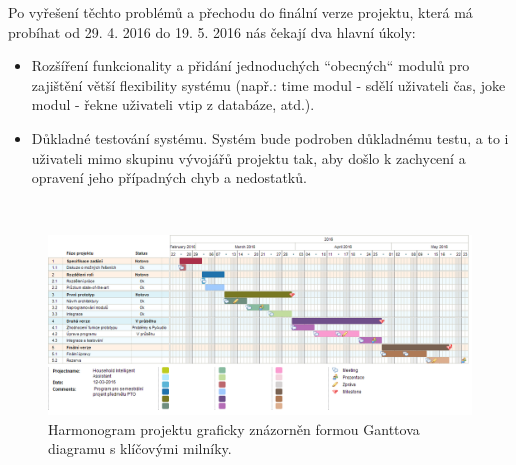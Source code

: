 \documentclass[12pt,a4paper]{article}
\begin{document}
Po vyřešení těchto problémů a přechodu do finální verze projektu, která má probíhat od 29. 4. 2016 do 19. 5. 2016 nás čekají dva hlavní úkoly: 
\begin{itemize}
	\item Rozšíření funkcionality a přidání jednoduchých “obecných“ modulů pro zajištění větší flexibility systému (např.: time modul - sdělí uživateli čas, joke modul - řekne uživateli vtip z databáze, atd.).
	\item Důkladné testování systému. Systém bude podroben důkladnému testu, a to i uživateli mimo skupinu vývojářů projektu tak, aby došlo k zachycení a opravení jeho případných chyb a nedostatků.
\end{itemize}

\begin{landscape}
~\vfill
\begin{figure}[ht]
	\begin{center}
	\includegraphics[height = 0.6\textheight ]{PTO-Gantt.png}
	\caption{Harmonogram projektu graficky znázorněn formou Ganttova diagramu s klíčovými milníky.}
	\label{fig:diagram_gantt}
	\end{center}
\end{figure}
\vfill
\end{landscape}
\end{document}

